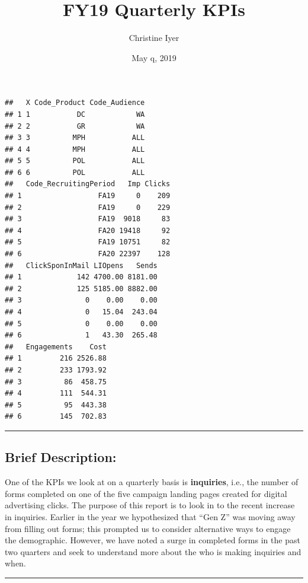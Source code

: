 \documentclass[]{tufte-handout}
\title{FY19 Quarterly KPIs}
\author{Christine Iyer}
\date{May q, 2019}
\begin{document}
\maketitle




\begin{verbatim}
##   X Code_Product Code_Audience
## 1 1           DC            WA
## 2 2           GR            WA
## 3 3          MPH           ALL
## 4 4          MPH           ALL
## 5 5          POL           ALL
## 6 6          POL           ALL
##   Code_RecruitingPeriod   Imp Clicks
## 1                  FA19     0    209
## 2                  FA19     0    229
## 3                  FA19  9018     83
## 4                  FA20 19418     92
## 5                  FA19 10751     82
## 6                  FA20 22397    128
##   ClickSponInMail LIOpens   Sends
## 1             142 4700.00 8181.00
## 2             125 5185.00 8882.00
## 3               0    0.00    0.00
## 4               0   15.04  243.04
## 5               0    0.00    0.00
## 6               1   43.30  265.48
##   Engagements    Cost
## 1         216 2526.88
## 2         233 1793.92
## 3          86  458.75
## 4         111  544.31
## 5          95  443.38
## 6         145  702.83
\end{verbatim}

\begin{center}\rule{0.5\linewidth}{\linethickness}\end{center}

\hypertarget{brief-description}{%
\subsection{Brief Description:}\label{brief-description}}

One of the KPIs we look at on a quarterly basis is \textbf{inquiries},
i.e., the number of forms completed on one of the five campaign landing
pages created for digital advertising clicks. The purpose of this report
is to look in to the recent increase in inquiries. Earlier in the year
we hypothesized that ``Gen Z'' was moving away from filling out forms;
this prompted us to consider alternative ways to engage the demographic.
However, we have noted a surge in completed forms in the past two
quarters and seek to understand more about the who is making inquiries
and when.

\begin{center}\rule{0.5\linewidth}{\linethickness}\end{center}
\end{document}
